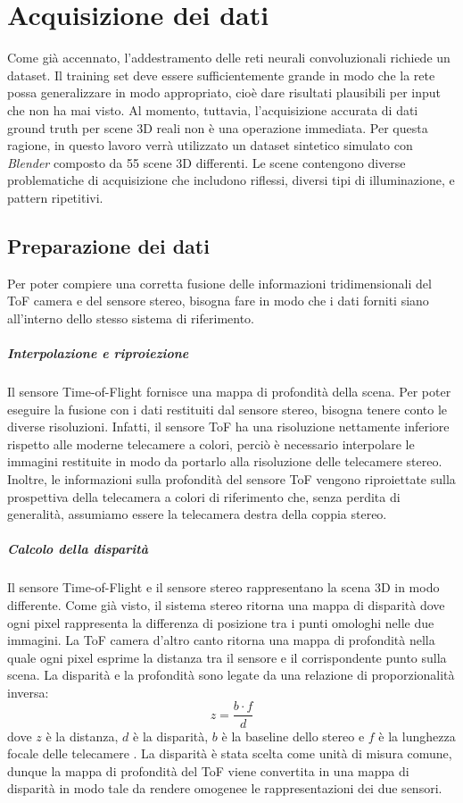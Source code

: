 \chapter{Acquisizione dei dati}
Come già accennato, l'addestramento delle reti neurali convoluzionali richiede un dataset. Il training set deve essere sufficientemente grande in modo che la rete possa generalizzare in modo appropriato, cioè dare risultati plausibili per input che non ha mai visto. Al momento, tuttavia, l'acquisizione accurata di dati ground truth per scene 3D reali non è una operazione immediata. Per questa ragione, in questo lavoro verrà utilizzato un dataset sintetico simulato con \textit{Blender} composto da 55 scene 3D differenti. Le scene contengono diverse problematiche di acquisizione che includono riflessi, diversi tipi di illuminazione, e pattern ripetitivi. 

\section{Preparazione dei dati}
Per poter compiere una corretta fusione delle informazioni tridimensionali del ToF camera e del sensore stereo, bisogna fare in modo che i dati forniti siano all'interno dello stesso sistema di riferimento.

\paragraph{Interpolazione e riproiezione}
Il sensore Time-of-Flight fornisce una mappa di profondità della scena. Per poter eseguire la fusione con i dati restituiti dal sensore stereo, bisogna tenere conto le diverse risoluzioni. Infatti, il sensore ToF ha una risoluzione nettamente inferiore rispetto alle moderne telecamere a colori, perciò è necessario interpolare le immagini restituite in modo da portarlo alla risoluzione delle telecamere stereo.\\
Inoltre, le informazioni sulla profondità del sensore ToF vengono riproiettate sulla prospettiva della telecamera a colori di riferimento che, senza perdita di generalità, assumiamo essere la telecamera destra della coppia stereo. 

\paragraph{Calcolo della disparità}
Il sensore Time-of-Flight e il sensore stereo rappresentano la scena 3D in modo differente. Come già visto, il sistema stereo ritorna una mappa di disparità dove ogni pixel rappresenta la differenza di posizione tra i punti omologhi nelle due immagini. La ToF camera d'altro canto ritorna una mappa di profondità nella quale ogni pixel esprime la distanza tra il sensore e il corrispondente punto sulla scena. La disparità e la profondità sono legate da una relazione di proporzionalità inversa:
$$z=\frac{b\cdot f}{d}$$
dove $z$ è la distanza, $d$ è la disparità, $b$ è la baseline dello stereo e $f$ è la lunghezza focale delle telecamere \cite{rif1}. La disparità è stata scelta come unità di misura comune, dunque la mappa di profondità del ToF viene convertita in una mappa di disparità in modo tale da rendere omogenee le rappresentazioni dei due sensori.

